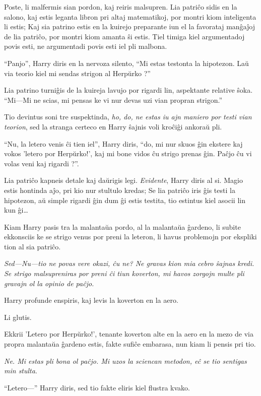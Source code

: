 Poste, li malfermis sian pordon, kaj reiris malsupren. Lia patriĉo
sidis en la salono, kaj estis leganta libron pri altaj matematikoj,
por montri kiom inteligenta li estis; Kaj sia patrino estis en la
kuirejo preparante iun el la favorataj manĝaĵoj de lia patriĉo, por
montri kiom amanta ŝi estis. Tiel timiga kiel argumentadoj povis esti,
ne argumentadi povis esti iel pli malbona.

``Panjo'', Harry diris en la nervoza silento, ``Mi estas testonta la
hipotezon. Laŭ via teorio kiel mi sendas strigon al Herpŭrko ?''

Lia patrino turniĝis de la kuireja lavujo por rigardi lin, aspektante
relative ŝoka. ``Mi—Mi ne scias, mi pensas ke vi nur devas uzi vian
propran strigon.''

Tio devintus soni tre suspektinda, \emph{ho, do, ne estas iu ajn maniero por
  testi vian teorion}, sed la stranga certeco en Harry ŝajnis voli
kroĉiĝi ankoraŭ pli.

``Nu, la letero venis ĉi tien iel'', Harry diris, ``do, mi nur skuos
ĝin ekstere kaj vokos 'letero por Herpŭrko!', kaj mi bone vidos ĉu
strigo prenas ĝin. Paĉjo ĉu vi volas veni kaj rigardi ?''.

Lia patriĉo kapneis detale kaj daŭrigis legi. \emph{Evidente}, Harry
diris al si. Magio estis hontinda aĵo, pri kio nur stultulo kredas; Se
lia patriĉo iris ĝis testi la hipotezon, aŭ simple rigardi ĝin dum ĝi
estis testita, tio estintus kiel asocii lin kun ĝi\ldots

Kiam Harry pasis tra la malantaŭa pordo, al la malantaŭa ĝardeno, li
subite ekkonsciis ke se strigo venus por preni la leteron, li havus
problemojn por ekspliki tion al sia patriĉo.

\emph{Sed—Nu—tio ne povas vere okazi, ĉu ne? Ne gravas kion mia cebro
  ŝajnas kredi. Se strigo malsupreniras por preni ĉi tiun koverton, mi
  havos zorgojn multe pli gravajn ol la opinio de paĉjo.}

Harry profunde enspiris, kaj levis la koverton en la aero.

Li glutis.

Ekkrii 'Letero por Herpŭrko!', tenante koverton alte en la aero en la
mezo de via propra malantaŭa ĝardeno estis, fakte sufiĉe embarasa,
nun kiam li pensis pri tio.

\emph{Ne. Mi estas pli bona ol paĉjo. Mi uzos la sciencan metodon, eĉ
  se tio sentigas min stulta}.

``Letero—'' Harry diris, sed tio fakte eliris kiel flustra kvako.

